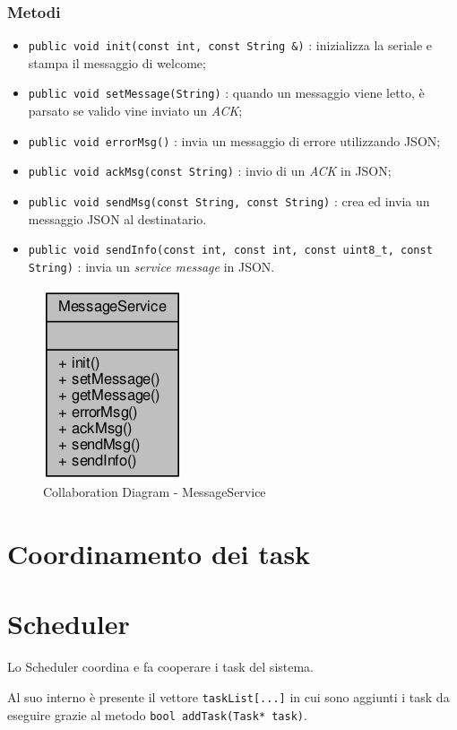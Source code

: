 \subsubsection{Metodi}
\begin{itemize}
	\item \texttt{public void init(const int, const String \&)} : inizializza la seriale e stampa il messaggio di welcome;
	\item \texttt{public void setMessage(String)} : quando un messaggio viene letto, è parsato se valido vine inviato un \textit{ACK};
	\item \texttt{public void errorMsg()} : invia un messaggio di errore utilizzando JSON;
	\item \texttt{public void ackMsg(const String)} : invio di un \textit{ACK} in JSON;
	\item \texttt{public void sendMsg(const String, const String)} : crea ed invia un messaggio JSON al destinatario.
	\item \texttt{public void sendInfo(const int, const int, const uint8\_t, const String)} : invia un \textit{service message} in JSON.
\end{itemize}
\begin{figure}[!ht]
	\centering
	\includegraphics[scale=.5]{img/UML/CollaborationDiagram/MessageService.png}
	\caption{Collaboration Diagram - MessageService}
\end{figure}

\newpage
\section{Coordinamento dei task}
\section{Scheduler}
Lo Scheduler coordina e fa cooperare i task del sistema.

Al suo interno è presente il vettore \texttt{taskList[...]} in cui sono aggiunti i task da eseguire grazie al metodo \texttt{bool addTask(Task* task)}.

